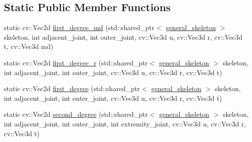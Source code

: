 \subsection*{Static Public Member Functions}
\begin{DoxyCompactItemize}
\item 
static cv\-::\-Vec2d \hyperlink{classmae_1_1fl_1_1angular__skeleton__controller_afc0d691a164e4edd2855a5290e847b5c}{first\-\_\-degree\-\_\-md} (std\-::shared\-\_\-ptr$<$ \hyperlink{classmae_1_1general__skeleton}{general\-\_\-skeleton} $>$ skeleton, int adjacent\-\_\-joint, int outer\-\_\-joint, cv\-::\-Vec3d u, cv\-::\-Vec3d r, cv\-::\-Vec3d t, cv\-::\-Vec3d md)
\item 
static cv\-::\-Vec2d \hyperlink{classmae_1_1fl_1_1angular__skeleton__controller_a1e608e81d3337b36e91a27640dd92c0f}{first\-\_\-degree\-\_\-r} (std\-::shared\-\_\-ptr$<$ \hyperlink{classmae_1_1general__skeleton}{general\-\_\-skeleton} $>$ skeleton, int adjacent\-\_\-joint, int outer\-\_\-joint, cv\-::\-Vec3d u, cv\-::\-Vec3d r, cv\-::\-Vec3d t)
\item 
static cv\-::\-Vec2d \hyperlink{classmae_1_1fl_1_1angular__skeleton__controller_abdfdeda38a788347e13418207564bc77}{first\-\_\-degree} (std\-::shared\-\_\-ptr$<$ \hyperlink{classmae_1_1general__skeleton}{general\-\_\-skeleton} $>$ skeleton, int adjacent\-\_\-joint, int outer\-\_\-joint, cv\-::\-Vec3d u, cv\-::\-Vec3d r, cv\-::\-Vec3d t)
\item 
static cv\-::\-Vec2d \hyperlink{classmae_1_1fl_1_1angular__skeleton__controller_a7b1f3466bf7553076db6e5f3ff97559d}{second\-\_\-degree} (std\-::shared\-\_\-ptr$<$ \hyperlink{classmae_1_1general__skeleton}{general\-\_\-skeleton} $>$ skeleton, int adjacent\-\_\-joint, int outer\-\_\-joint, int extremity\-\_\-joint, cv\-::\-Vec3d u, cv\-::\-Vec3d r, cv\-::\-Vec3d t)
\end{DoxyCompactItemize}


